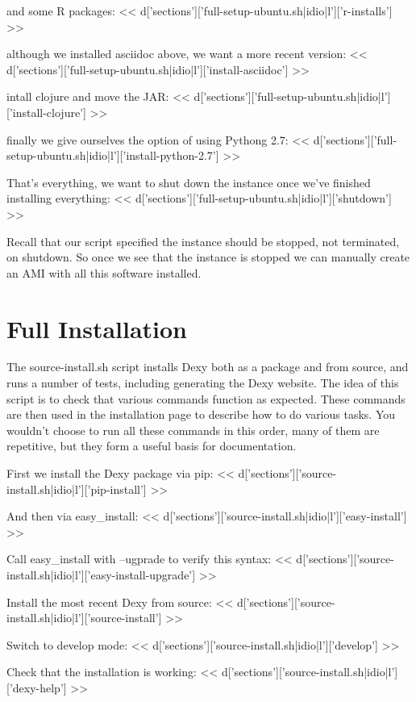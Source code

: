 \documentclass{tufte-handout}
\begin{document}
and some R packages:
<< d['sections']['full-setup-ubuntu.sh|idio|l']['r-installs'] >>

although we installed asciidoc above, we want a more recent version:
<< d['sections']['full-setup-ubuntu.sh|idio|l']['install-asciidoc'] >>

intall clojure and move the JAR:
<< d['sections']['full-setup-ubuntu.sh|idio|l']['install-clojure'] >>

finally we give ourselves the option of using Pythong 2.7:
<< d['sections']['full-setup-ubuntu.sh|idio|l']['install-python-2.7'] >>

That's everything, we want to shut down the instance once we've finished installing everything:
<< d['sections']['full-setup-ubuntu.sh|idio|l']['shutdown'] >>

Recall that our script specified the instance should be stopped, not terminated, on shutdown. So once we see that the instance is stopped we can manually create an AMI with all this software installed.

\section{Full Installation}

The source-install.sh script installs Dexy both as a package and from source, and runs a number of tests, including generating the Dexy website. The idea of this script is to check that various commands function as expected. These commands are then used in the installation page to describe how to do various tasks. You wouldn't choose to run all these commands in this order, many of them are repetitive, but they form a useful basis for documentation.

First we install the Dexy package via pip:
<< d['sections']['source-install.sh|idio|l']['pip-install'] >>

And then via easy\_install:
<< d['sections']['source-install.sh|idio|l']['easy-install'] >>

Call easy\_install with --ugprade to verify this syntax:
<< d['sections']['source-install.sh|idio|l']['easy-install-upgrade'] >>

Install the most recent Dexy from source:
<< d['sections']['source-install.sh|idio|l']['source-install'] >>

Switch to develop mode:
<< d['sections']['source-install.sh|idio|l']['develop'] >>

Check that the installation is working:
<< d['sections']['source-install.sh|idio|l']['dexy-help'] >>
\end{document}

